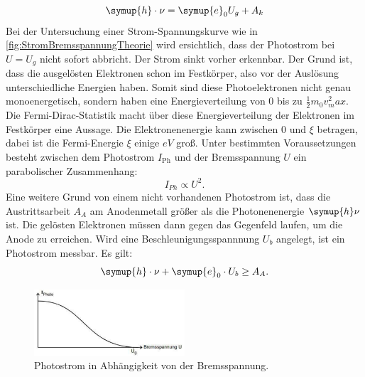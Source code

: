\begin{equation}\label{eqn:furb}
    \symup{h} \cdot \nu = \symup{e}_0 U_g + A_k
\end{equation}
\noindent
Bei der Untersuchung einer Strom-Spannungskurve wie in \autoref{fig:StromBremsspannungTheorie} wird ersichtlich, dass der Photostrom bei $U = U_g$ nicht sofort abbricht.
Der Strom sinkt vorher erkennbar.
Der Grund ist, dass die ausgelösten Elektronen schon im Festkörper, also vor der Auslösung unterschiedliche Energien haben.
Somit sind diese Photoelektronen nicht genau monoenergetisch, sondern haben eine Energieverteilung von 0 bis zu $\frac{1}{2} m_0 v^2_max$.
Die Fermi-Dirac-Statistik macht über diese Energieverteilung der Elektronen im Festkörper eine Aussage.
Die Elektronenenergie kann zwischen 0 und $\xi$  betragen, dabei ist die Fermi-Energie $\xi$ einige $eV$ groß.
Unter bestimmten Voraussetzungen besteht zwischen dem Photostrom $I_\text{Ph}$ und der Bremsspannung $U$ ein parabolischer Zusammenhang:
\begin{equation*}
    I_{Ph} \propto U^2.
\end{equation*}
Eine weitere Grund von einem nicht vorhandenen Photostrom ist, dass die Austrittsarbeit $A_A$ am Anodenmetall größer als die Photonenenergie $\symup{h} \nu$ ist.
Die gelösten Elektronen müssen dann gegen das Gegenfeld laufen, um die Anode zu erreichen.
Wird eine Beschleunigungsspannnung $U_b$ angelegt, ist ein Photostrom messbar.
Es gilt:
\begin{equation}
    \symup{h} \cdot \nu + \symup{e}_0 \cdot U_b \geq A_A.
\end{equation}

\begin{figure}
    \centering
    \includegraphics[width =0.5\textwidth]{content/StromBremsspannungTheorie.pdf}
    \caption{Photostrom in Abhängigkeit von der Bremsspannung.\cite{anleitung}}
    \label{fig:StromBremsspannungTheorie}
\end{figure}